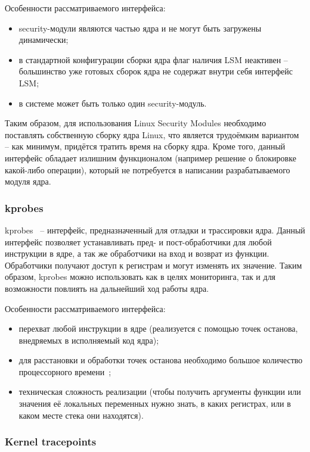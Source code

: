Особенности рассматриваемого интерфейса:

\begin{itemize}
	\item security-модули являются частью ядра и не могут быть загружены динамически;
	\item в стандартной конфигурации сборки ядра флаг наличия LSM неактивен -- большинство уже готовых сборок ядра не содержат внутри себя интерфейс LSM;
	\item в системе может быть только один security-модуль.
\end{itemize}

Таким образом, для использования Linux Security Modules необходимо поставлять собственную сборку ядра Linux, что является трудоёмким вариантом -- как минимум, придётся тратить время на сборку ядра. Кроме того, данный интерфейс обладает излишним функционалом (например решение о блокировке какой-либо операции), который не потребуется в написании разрабатываемого модуля ядра.

\subsubsection{kprobes}

kprobes~\cite{kprobes} -- интерфейс, предназначенный для отладки и трассировки ядра. Данный интерфейс позволяет устанавливать пред- и пост-обработчики для любой инструкции в ядре, а так же обработчики на вход и возврат из функции. Обработчики получают доступ к регистрам и могут изменять их значение. Таким образом, kprobes можно использовать как в целях мониторинга, так и для возможности повлиять на дальнейший ход работы ядра.

Особенности рассматриваемого интерфейса:

\begin{itemize}
	\item перехват любой инструкции в ядре (реализуется с помощью точек останова, внедряемых в исполняемый код ядра);
	\item для расстановки и обработки точек останова необходимо большое количество процессорного времени~\cite{habr-profiling-linux};
	\item техническая сложность реализации (чтобы получить аргументы функции или значения её локальных переменных нужно знать, в каких регистрах, или в каком месте стека они находятся).
\end{itemize}

\subsubsection{Kernel tracepoints}


